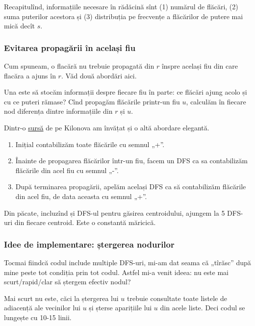 \documentclass[../main.tex]{subfiles}
\begin{document}
Recapitulînd, informațiile necesare în rădăcină sînt (1) numărul de flăcări, (2) suma puterilor acestora și (3) distribuția pe frecvențe a flăcărilor de putere mai mică decît $s$.

\subsubsection*{Evitarea propagării în același fiu}

Cum spuneam, o flacără nu trebuie propagată din $r$ înspre același fiu din care flacăra a ajuns în $r$. Văd două abordări aici.

Una este să stocăm informații despre fiecare fiu în parte: ce flăcări ajung acolo și cu ce puteri rămase? Cînd propagăm flăcările printr-un fiu $u$, calculăm în fiecare nod diferența dintre informațiile din $r$ și $u$.

Dintr-o \href{https://kilonova.ro/submissions/363653}{sursă} de pe Kilonova am învățat și o altă abordare elegantă.

\begin{enumerate}
  \item Inițial contabilizăm toate flăcările cu semnul „+”.

  \item Înainte de propagarea flăcărilor într-un fiu, facem un DFS ca sa contabilizăm flăcările din acel fiu cu semnul „-”.

  \item După terminarea propagării, apelăm același DFS ca să contabilizăm flăcările din acel fiu, de data aceasta cu semnul „+”.
\end{enumerate}

Din păcate, incluzînd și DFS-ul pentru găsirea centroidului, ajungem la 5 DFS-uri din fiecare centroid. Este o constantă măricică.

\subsubsection*{Idee de implementare: ștergerea nodurilor}

Tocmai fiindcă codul include multiple DFS-uri, mi-am dat seama că „tîrăsc” după mine peste tot condiția  prin tot codul. Astfel mi-a venit ideea: nu este mai scurt/rapid/clar să ștergem efectiv nodul?

Mai scurt nu este, căci la ștergerea lui $u$ trebuie consultate toate listele de adiacență ale vecinilor lui $u$ și șterse aparițiile lui $u$ din acele liste. Deci codul se lungește cu 10-15 linii.
\end{document}

